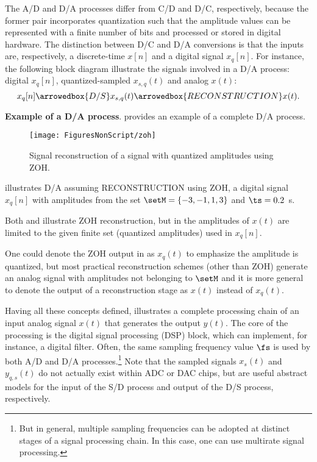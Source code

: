 The A/D and D/A processes differ from C/D and D/C, respectively, because the former pair incorporates quantization 
such that the amplitude values can be represented with a finite number of bits and processed or stored in digital hardware.
The distinction between D/C and D/A conversions is that the inputs are, respectively, a discrete-time $x[n]$ and a digital signal $x_q[n]$. For instance, the following block diagram illustrate the signals involved in a D/A process: digital $x_q[n]$, quantized-sampled $x_{s,q}(t)$ and analog $x(t)$:
\[x_q[n] \arrowedbox{D/S} x_{s,q}(t) \arrowedbox{RECONSTRUCTION} x(t).\]

\bExample \textbf{Example of a D/A process}.
 provides an example of a complete D/A process.

\begin{figure}
	\centering
		\texttt{[image: FiguresNonScript/zoh]}
	\caption{Signal reconstruction of a signal with quantized amplitudes using ZOH.\label{fig:zoh}}
\end{figure}
 illustrates D/A assuming RECONSTRUCTION using ZOH, a digital signal $x_q[n]$ with amplitudes from the set $\setM=\{-3,-1,1,3\}$ and $\ts=0.2$~s.
\eExample 

Both  and  illustrate ZOH reconstruction, but in  the amplitudes of $x(t)$ are limited to the given finite set (quantized amplitudes) used in $x_q[n]$.

One could denote the ZOH output  in  as $x_q(t)$ to emphasize the amplitude is quantized, but most practical reconstruction schemes (other than ZOH) generate an analog signal with amplitudes not belonging to $\setM$ and it is 
more general to denote the output of a reconstruction stage as $x(t)$ instead of $x_q(t)$. 


Having all these concepts defined,  illustrates a complete processing chain of an input analog signal $x(t)$
that generates the output $y(t)$. The core of the processing is the digital signal processing (DSP)
block, which can implement, for instance, a digital filter. Often, the same sampling frequency value $\fs$ is used
by both A/D and D/A processes.\footnote{But in general, multiple sampling frequencies can be adopted at distinct
stages of a signal processing chain. In this case, one can use multirate signal processing.} Note that the sampled signals $x_s(t)$ and $y_{q,s}(t)$ do not
actually exist within ADC or DAC chips, but are useful abstract models for the
input of the S/D process and output of the D/S process, respectively.

